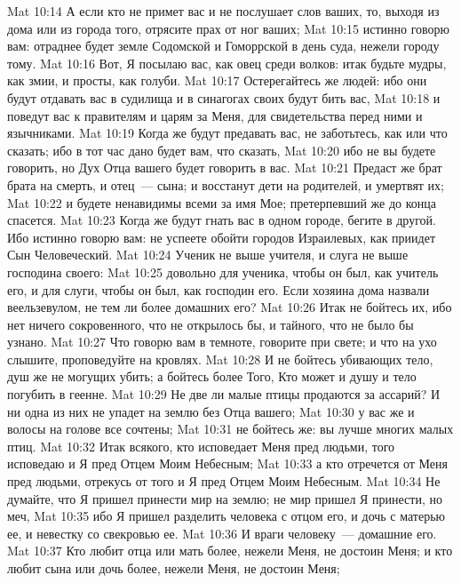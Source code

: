 \vs Mat 10:14 А если кто не примет вас и не послушает слов ваших, то, выходя из дома или из города того, отрясите прах от ног ваших;
\vs Mat 10:15 истинно говорю вам: отраднее будет земле Содомской и Гоморрской в день суда, нежели городу тому.
\vs Mat 10:16 Вот, Я посылаю вас, как овец среди волков: итак будьте мудры, как змии, и просты, как голуби.
\vs Mat 10:17 Остерегайтесь же людей: ибо они будут отдавать вас в судилища и в синагогах своих будут бить вас,
\vs Mat 10:18 и поведут вас к правителям и царям за Меня, для свидетельства перед ними и язычниками.
\vs Mat 10:19 Когда же будут предавать вас, не заботьтесь, как или что сказать; ибо в тот час дано будет вам, что сказать,
\vs Mat 10:20 ибо не вы будете говорить, но Дух Отца вашего будет говорить в вас.
\vs Mat 10:21 Предаст же брат брата на смерть, и отец~--- сына; и восстанут дети на родителей, и умертвят их;
\vs Mat 10:22 и будете ненавидимы всеми за имя Мое; претерпевший же до конца спасется.
\vs Mat 10:23 Когда же будут гнать вас в одном городе, бегите в другой. Ибо истинно говорю вам: не успеете обойти городов Израилевых, как приидет Сын Человеческий.
\vs Mat 10:24 Ученик не выше учителя, и слуга не выше господина своего:
\vs Mat 10:25 довольно для ученика, чтобы он был, как учитель его, и для слуги, чтобы он был, как господин его. Если хозяина дома назвали веельзевулом, не тем ли более домашних его?
\vs Mat 10:26 Итак не бойтесь их, ибо нет ничего сокровенного, что не открылось бы, и тайного, что не было бы узнано.
\vs Mat 10:27 Что говорю вам в темноте, говорите при свете; и что на ухо слышите, проповедуйте на кровлях.
\vs Mat 10:28 И не бойтесь убивающих тело, душ же не могущих убить; а бойтесь более Того, Кто может и душу и тело погубить в геенне.
\vs Mat 10:29 Не две ли малые птицы продаются за ассарий? И ни одна из них не упадет на землю без  Отца вашего;
\vs Mat 10:30 у вас же и волосы на голове все сочтены;
\vs Mat 10:31 не бойтесь же: вы лучше многих малых птиц.
\vs Mat 10:32 Итак всякого, кто исповедает Меня пред людьми, того исповедаю и Я пред Отцем Моим Небесным;
\vs Mat 10:33 а кто отречется от Меня пред людьми, отрекусь от того и Я пред Отцем Моим Небесным.
\vs Mat 10:34 Не думайте, что Я пришел принести мир на землю; не мир пришел Я принести, но меч,
\vs Mat 10:35 ибо Я пришел разделить человека с отцом его, и дочь с матерью ее, и невестку со свекровью ее.
\vs Mat 10:36 И враги человеку~--- домашние его.
\vs Mat 10:37 Кто любит отца или мать более, нежели Меня, не достоин Меня; и кто любит сына или дочь более, нежели Меня, не достоин Меня;
